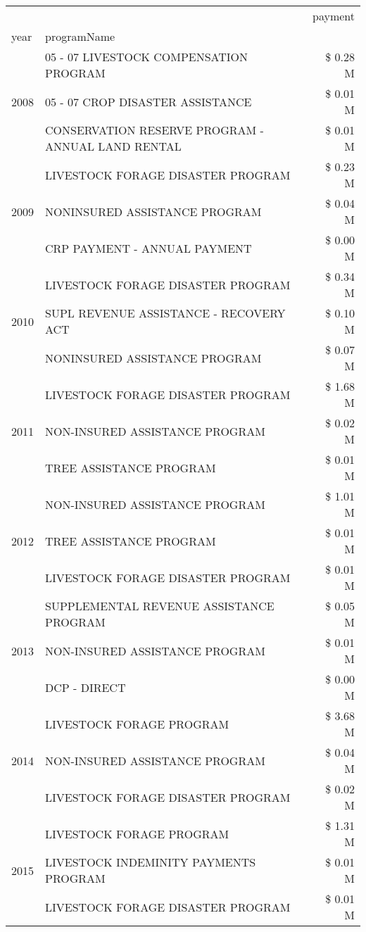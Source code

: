 \begin{tabular}{llr}
\toprule
 &  & payment \\
year & programName &  \\
\midrule
\multirow[t]{3}{*}{2008} & 05 - 07 LIVESTOCK COMPENSATION PROGRAM & \$ 0.28 M \\
 & 05 - 07 CROP DISASTER ASSISTANCE & \$ 0.01 M \\
 & CONSERVATION RESERVE PROGRAM - ANNUAL LAND RENTAL & \$ 0.01 M \\
\cline{1-3}
\multirow[t]{3}{*}{2009} & LIVESTOCK FORAGE DISASTER  PROGRAM & \$ 0.23 M \\
 & NONINSURED ASSISTANCE PROGRAM & \$ 0.04 M \\
 & CRP PAYMENT - ANNUAL PAYMENT & \$ 0.00 M \\
\cline{1-3}
\multirow[t]{3}{*}{2010} & LIVESTOCK FORAGE DISASTER PROGRAM & \$ 0.34 M \\
 & SUPL REVENUE ASSISTANCE - RECOVERY ACT & \$ 0.10 M \\
 & NONINSURED ASSISTANCE PROGRAM & \$ 0.07 M \\
\cline{1-3}
\multirow[t]{3}{*}{2011} & LIVESTOCK FORAGE DISASTER PROGRAM & \$ 1.68 M \\
 & NON-INSURED ASSISTANCE PROGRAM & \$ 0.02 M \\
 & TREE ASSISTANCE PROGRAM & \$ 0.01 M \\
\cline{1-3}
\multirow[t]{3}{*}{2012} & NON-INSURED ASSISTANCE PROGRAM & \$ 1.01 M \\
 & TREE ASSISTANCE PROGRAM & \$ 0.01 M \\
 & LIVESTOCK FORAGE DISASTER PROGRAM & \$ 0.01 M \\
\cline{1-3}
\multirow[t]{3}{*}{2013} & SUPPLEMENTAL REVENUE ASSISTANCE PROGRAM & \$ 0.05 M \\
 & NON-INSURED ASSISTANCE PROGRAM & \$ 0.01 M \\
 & DCP - DIRECT & \$ 0.00 M \\
\cline{1-3}
\multirow[t]{3}{*}{2014} & LIVESTOCK FORAGE PROGRAM & \$ 3.68 M \\
 & NON-INSURED ASSISTANCE PROGRAM & \$ 0.04 M \\
 & LIVESTOCK FORAGE DISASTER PROGRAM & \$ 0.02 M \\
\cline{1-3}
\multirow[t]{3}{*}{2015} & LIVESTOCK FORAGE PROGRAM & \$ 1.31 M \\
 & LIVESTOCK INDEMINITY PAYMENTS PROGRAM & \$ 0.01 M \\
 & LIVESTOCK FORAGE DISASTER PROGRAM & \$ 0.01 M \\

\end{tabular}
